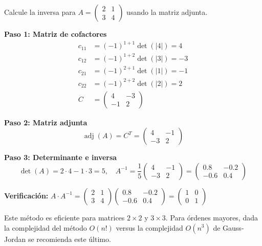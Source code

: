 


\begin{example} Calcule la inversa para \( A = \begin{pmatrix} 2 & 1 \\ 3 & 4 \end{pmatrix} \) usando la matriz adjunta.
\begin{myproof}
\textbf{Paso 1: Matriz de cofactores}
\begin{align*}
c_{11} &= (-1)^{1+1} \det(|4|) = 4 \\
c_{12} &= (-1)^{1+2} \det(|3|) = -3 \\
c_{21} &= (-1)^{2+1} \det(|1|) = -1 \\
c_{22} &= (-1)^{2+2} \det(|2|) = 2 \\
C &= \begin{pmatrix} 4 & -3 \\ -1 & 2 \end{pmatrix}
\end{align*}

\textbf{Paso 2: Matriz adjunta}
\[
\operatorname{adj}(A) = C^T = \begin{pmatrix} 4 & -1 \\ -3 & 2 \end{pmatrix}
\]

\textbf{Paso 3: Determinante e inversa}
\[
\det(A) = 2\cdot4 - 1\cdot3 = 5, \quad A^{-1} = \frac{1}{5} \begin{pmatrix} 4 & -1 \\ -3 & 2 \end{pmatrix} = \begin{pmatrix} 0.8 & -0.2 \\ -0.6 & 0.4 \end{pmatrix}
\]

\textbf{Verificación:} \( A \cdot A^{-1} = \begin{pmatrix} 2 & 1 \\ 3 & 4 \end{pmatrix} \begin{pmatrix} 0.8 & -0.2 \\ -0.6 & 0.4 \end{pmatrix} = \begin{pmatrix} 1 & 0 \\ 0 & 1 \end{pmatrix} \)
\end{myproof}
\end{example}

\begin{rem}
Este método es eficiente para matrices \( 2\times 2 \) y \( 3\times 3 \). Para órdenes mayores, dada la complejidad del método \( O(n!) \) versus la complejidad \( O(n^3) \) de Gauss-Jordan se recomienda este último.
\end{rem}

